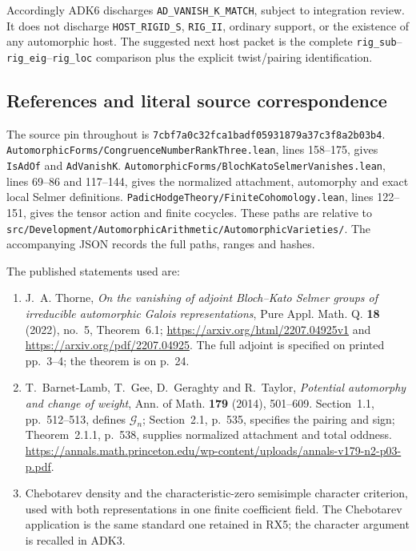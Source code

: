 \documentclass[11pt,a4paper]{article}
\numberwithin{equation}{section}
\theoremstyle{remark}\newtheorem{remark}[theorem]{Remark}
\begin{document}
Accordingly ADK6 discharges \texttt{AD\_\allowbreak VANISH\_\allowbreak K\_\allowbreak MATCH}, subject to
integration review.  It does not discharge \texttt{HOST\_\allowbreak RIGID\_\allowbreak S},
\texttt{RIG\_\allowbreak II}, ordinary support, or the existence of any
automorphic host.  The suggested next host packet is the complete
\texttt{rig\_\allowbreak sub}--\texttt{rig\_\allowbreak eig}--\texttt{rig\_\allowbreak loc}
comparison plus the explicit twist/pairing identification.

\subsection{References and literal source correspondence}

The source pin throughout is
\texttt{7cbf7a0c32fca1badf05931879a37c3f8a2b03b4}.
\texttt{Automorphic\allowbreak Forms/\allowbreak Congruence\allowbreak Number\allowbreak Rank\allowbreak Three.\allowbreak lean},
lines 158--175, gives \texttt{Is\allowbreak Ad\allowbreak Of} and \texttt{Ad\allowbreak Vanish\allowbreak K}.
\texttt{Automorphic\allowbreak Forms/\allowbreak Bloch\allowbreak Kato\allowbreak Selmer\allowbreak Vanishes.\allowbreak lean},
lines 69--86 and 117--144, gives the normalized attachment,
automorphy and exact local Selmer definitions.
\texttt{Padic\allowbreak Hodge\allowbreak Theory/\allowbreak Finite\allowbreak Cohomology.\allowbreak lean},
lines 122--151, gives the tensor action and finite cocycles.
These paths are relative to
\texttt{src/\allowbreak Development/\allowbreak Automorphic\allowbreak Arithmetic/\allowbreak Automorphic\allowbreak Varieties/\allowbreak }.
The accompanying JSON records the full paths, ranges and hashes.

The published statements used are:
\begin{enumerate}
\item J.~A. Thorne, \emph{On the vanishing of adjoint Bloch--Kato
  Selmer groups of irreducible automorphic Galois representations},
  Pure Appl. Math. Q. \textbf{18} (2022), no.~5, Theorem~6.1;
  \url{https://arxiv.org/html/2207.04925v1} and
  \url{https://arxiv.org/pdf/2207.04925}.  The full adjoint is
  specified on printed pp.~3--4; the theorem is on p.~24.
\item T.~Barnet-Lamb, T.~Gee, D.~Geraghty and R.~Taylor,
  \emph{Potential automorphy and change of weight},
  Ann. of Math. \textbf{179} (2014), 501--609.
  Section~1.1, pp.~512--513, defines $\mathcal G_n$;
  Section~2.1, p.~535, specifies the pairing and sign;
  Theorem~2.1.1, p.~538, supplies normalized attachment and
  total oddness.
  \url{https://annals.math.princeton.edu/wp-content/uploads/annals-v179-n2-p03-p.pdf}.
\item Chebotarev density and the characteristic-zero semisimple
  character criterion, used with both representations in one finite
  coefficient field.  The Chebotarev application is the same standard
  one retained in RX5; the character argument is recalled in ADK3.
\end{enumerate}
\end{document}

